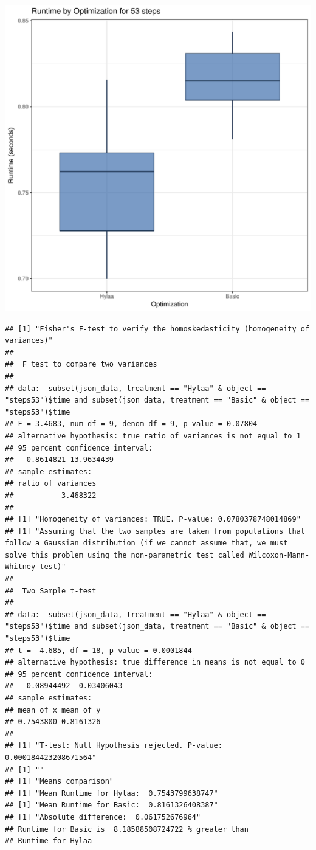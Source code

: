 \documentclass{article}\usepackage[]{graphicx}\usepackage[]{color}
\makeatletter
\def\maxwidth{ %
  \ifdim\Gin@nat@width>\linewidth
    \linewidth
  \else
    \Gin@nat@width
  \fi
}
\newenvironment{kframe}{%
 \def\at@end@of@kframe{}%
 \ifinner\ifhmode%
  \def\at@end@of@kframe{\end{minipage}}%
  \begin{minipage}{\columnwidth}%
 \fi\fi%
 \def\FrameCommand##1{\hskip\@totalleftmargin \hskip-\fboxsep
 \colorbox{shadecolor}{##1}\hskip-\fboxsep
     \hskip-\linewidth \hskip-\@totalleftmargin \hskip\columnwidth}%
 \MakeFramed {\advance\hsize-\width
   \@totalleftmargin\z@ \linewidth\hsize
   \@setminipage}}%
 {\par\unskip\endMakeFramed%
 \at@end@of@kframe}
\newenvironment{knitrout}{}{} %
\makeatother
\begin{document}
\begin{knitrout}
\color{fgcolor}
\includegraphics[width=\maxwidth]{figure/RH3_steps53-1} 
\begin{kframe}\begin{verbatim}
## [1] "Fisher's F-test to verify the homoskedasticity (homogeneity of variances)"
## 
## 	F test to compare two variances
## 
## data:  subset(json_data, treatment == "Hylaa" & object == "steps53")$time and subset(json_data, treatment == "Basic" & object == "steps53")$time
## F = 3.4683, num df = 9, denom df = 9, p-value = 0.07804
## alternative hypothesis: true ratio of variances is not equal to 1
## 95 percent confidence interval:
##   0.8614821 13.9634439
## sample estimates:
## ratio of variances 
##           3.468322 
## 
## [1] "Homogeneity of variances: TRUE. P-value: 0.0780378748014869"
## [1] "Assuming that the two samples are taken from populations that follow a Gaussian distribution (if we cannot assume that, we must solve this problem using the non-parametric test called Wilcoxon-Mann-Whitney test)"
## 
## 	Two Sample t-test
## 
## data:  subset(json_data, treatment == "Hylaa" & object == "steps53")$time and subset(json_data, treatment == "Basic" & object == "steps53")$time
## t = -4.685, df = 18, p-value = 0.0001844
## alternative hypothesis: true difference in means is not equal to 0
## 95 percent confidence interval:
##  -0.08944492 -0.03406043
## sample estimates:
## mean of x mean of y 
## 0.7543800 0.8161326 
## 
## [1] "T-test: Null Hypothesis rejected. P-value: 0.000184423208671564"
## [1] ""
## [1] "Means comparison"
## [1] "Mean Runtime for Hylaa:  0.7543799638747"
## [1] "Mean Runtime for Basic:  0.8161326408387"
## [1] "Absolute difference:  0.061752676964"
## Runtime for Basic is  8.18588508724722 % greater than 
## Runtime for Hylaa
\end{verbatim}
\end{kframe}
\end{knitrout}
\end{document}
